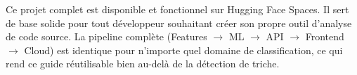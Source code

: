 \documentclass[a4paper,11pt]{article}
\begin{document}
\vspace{1em}
Ce projet complet est disponible et fonctionnel sur Hugging Face Spaces. Il sert de base solide pour tout développeur souhaitant créer son propre outil d'analyse de code source. La pipeline complète (Features $\rightarrow$ ML $\rightarrow$ API $\rightarrow$ Frontend $\rightarrow$ Cloud) est identique pour n'importe quel domaine de classification, ce qui rend ce guide réutilisable bien au-delà de la détection de triche.
\end{document}
